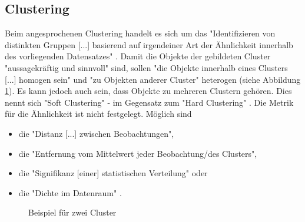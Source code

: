 \subsection{Clustering}
Beim angesprochenen Clustering handelt es sich um das "Identifizieren von distinkten Gruppen [...] basierend auf irgendeiner Art der Ähnlichkeit innerhalb des vorliegenden Datensatzes" \citep[S.~195; eigene Übersetzung]{swamynathan_mastering_2017}. Damit die Objekte der gebildeten Cluster "aussagekräftig und sinnvoll" sind, sollen "die Objekte innerhalb eines Clusters [...] homogen sein" und "zu Objekten anderer Cluster" \citep[S.~337; eigene Übersetzung]{ramasubramanian_machine_2017} heterogen (siehe Abbildung \ref{fig:clustering}). Es kann jedoch auch sein, dass Objekte zu mehreren Clustern gehören. Dies nennt sich "Soft Clustering" - im Gegensatz zum "Hard Clustering" \citep[S.~339]{ramasubramanian_machine_2017}. Die Metrik für die Ähnlichkeit ist nicht festgelegt. Möglich sind 
\begin{itemize}
\item die "Distanz [...] zwischen Beobachtungen", 
\item die "Entfernung vom Mittelwert jeder Beobachtung/des Clusters",
\item die "Signifikanz [einer] statistischen Verteilung" oder
\item die "Dichte im Datenraum" \citep[S.~338; eigene Übersetzung]{ramasubramanian_machine_2017}.
\end{itemize}
\begin{figure}[H]
\centering
{}
\caption{Beispiel für zwei Cluster \citep[S.~9]{suthaharan_machine_2016}}
\label{fig:clustering}
\end{figure}


